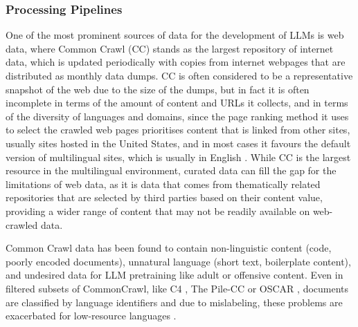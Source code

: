 
\subsubsection{Processing Pipelines}
\label{subsubsec:data-processing-pipelines}



One of the most prominent sources of data for the development of LLMs is web data, where Common Crawl (CC) stands as the largest repository of internet data, which is updated periodically with copies from internet webpages that are distributed as monthly data dumps. 
CC is often considered to be a representative snapshot of the web due to the size of the dumps, but in fact it is often incomplete in terms of the amount of content and URLs it collects, and in terms of the diversity of languages and domains, since the page ranking method it uses to select the crawled web pages prioritises content that is linked from other sites, usually sites hosted in the United States, and in most cases it favours the default version of multilingual sites, which is usually in English \cite{back_critical_2024}.
While CC is the largest resource in the multilingual environment, curated data can fill the gap for the limitations of web data, as it is data that comes from thematically related repositories that are selected by third parties based on their content value, providing a wider range of content that may not be readily available on web-crawled data.

Common Crawl data has been found to contain non-linguistic content (code, poorly encoded documents), unnatural language (short text, boilerplate content), and undesired data for LLM pretraining like adult or offensive content. Even in filtered subsets of CommonCrawl, like C4 \cite{raffel_exploring_2023}, The Pile-CC \cite{gao_pile_2020} or OSCAR \cite{abadji_cleaner_2020}, documents are classified by language identifiers and due to mislabeling, these problems are exacerbated for low-resource languages \cite{caswell_quality_2021}. 


